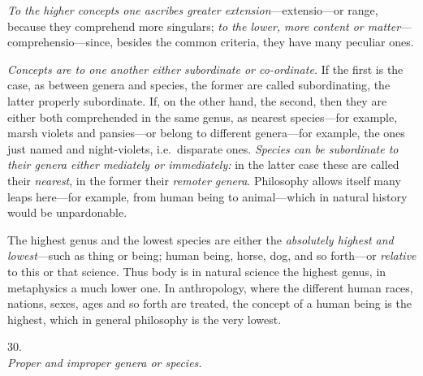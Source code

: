 \documentclass[12pt,a4paper]{article}
\newcommand{\logsec}[2]{%
  \bigskip\begin{center}{\large #1}\\[4pt]{\emph{#2}}\end{center}\smallskip}
\begin{document}
\emph{To the higher concepts one ascribes greater extension}---extensio---or
range, because they comprehend more singulars; \emph{to the lower, more content
or matter}---comprehensio---since, besides the common criteria, they have many
peculiar ones.

\emph{Concepts are to one another either subordinate or co-ordinate.} If the
first is the case, as between genera and species, the former are called
subordinating, the latter properly subordinate. If, on the other hand, the
second, then they are either both comprehended in the same genus, as nearest
species---for example, marsh violets and pansies---or belong to different
genera---for example, the ones just named and night-violets, i.e.\ disparate
ones. \emph{Species can be subordinate to their genera either mediately or
immediately:} in the latter case
these are called their \emph{nearest}, in the former their \emph{remoter
genera}. Philosophy allows itself many leaps here---for example, from human
being to animal---which in natural history would be unpardonable.

The highest genus and the lowest species are either the \emph{absolutely highest
and lowest}---such as thing or being; human being, horse, dog, and so
forth---or \emph{relative} to this or that science. Thus body is in natural
science the highest genus, in metaphysics a much lower one. In anthropology,
where the different human races, nations, sexes, ages and so forth are treated,
the concept of a human being is the highest, which in general philosophy is the
very lowest.

\logsec{30.}{Proper and improper genera or species.}
\end{document}

